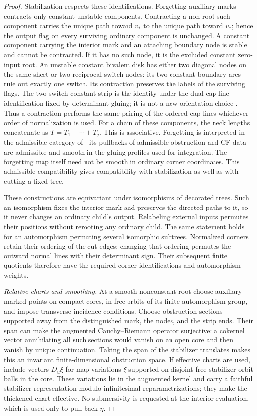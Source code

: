 \begin{proof}
Stabilization respects these identifications.  Forgetting auxiliary
marks contracts only constant unstable components.  Contracting a
non-root such component carries the unique path toward $v_*$ to the
unique path toward $v_*$; hence the output flag on every surviving
ordinary component is unchanged.  A constant component carrying the
interior mark and an attaching boundary node is stable and cannot
be contracted.  If it has no such node, it is the excluded constant
zero-input root.  An unstable constant bivalent disk has either two
diagonal nodes on the same sheet or two reciprocal switch nodes:
its two constant boundary arcs rule out exactly one switch.  Its
contraction preserves the labels of the surviving flags.  The
two-switch constant strip is the identity under the dual cap-line
identification fixed by determinant gluing; it is not a new
orientation choice \cite[Sections~4.3 and~5]{AkahoJoyce}.
Thus a contraction performs the same pairing
of the ordered cap lines whichever order of normalization is used.
For a chain of these components, the neck lengths concatenate as
$T=T_1+\cdots+T_j$.  This is associative.  Forgetting is interpreted
in the admissible category of \cite[Section~14.3]{AFOOO2026}:
its pullbacks of admissible obstruction and CF data are admissible
and smooth in the gluing profiles used for integration.  The
forgetting map itself need not be smooth in ordinary corner
coordinates.  This admissible compatibility gives compatibility
with stabilization as well as with cutting a fixed tree.

These constructions are equivariant under isomorphisms of decorated
trees.  Such an isomorphism fixes the interior mark and preserves
the directed paths to it, so it never changes an ordinary child's
output.  Relabeling external inputs permutes their positions without
rerooting any ordinary child.  The same statement holds for an
automorphism permuting several isomorphic subtrees.  Normalized
corners retain their ordering of the cut edges; changing that
ordering permutes the outward normal lines with their determinant
sign.  Their subsequent finite quotients therefore have the required
corner identifications and automorphism weights.

\emph{Relative charts and smoothing.}
At a smooth nonconstant root choose auxiliary marked points on
compact cores, in free orbits of its finite automorphism group,
and impose transverse incidence conditions.  Choose obstruction
sections supported away from the distinguished mark, the nodes,
and the strip ends.  Their span can make the augmented
Cauchy--Riemann operator surjective: a cokernel vector annihilating
all such sections would vanish on an open core and then vanish by
unique continuation.  Taking the span of the stabilizer translates
makes this an invariant finite-dimensional obstruction space.
If effective charts are used, include vectors $D_u\xi$ for map
variations $\xi$ supported on disjoint free stabilizer-orbit balls
in the core.  These variations lie in the augmented kernel and
carry a faithful stabilizer representation modulo infinitesimal
reparametrizations; they make the thickened chart effective.
No submersivity is requested at the interior evaluation, which is
used only to pull back $\eta$.


\end{proof}
